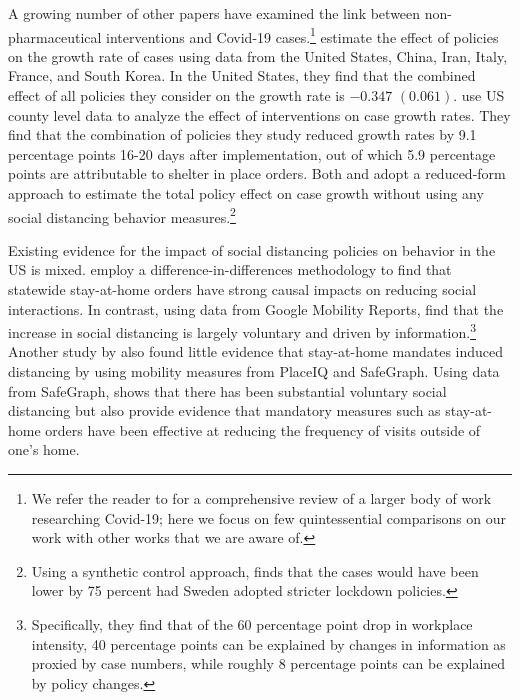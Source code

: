 \documentclass[3p, longtitle]{elsarticle}
\theoremstyle{definition}
\begin{document}
%
%



A growing number of other papers have examined the link between non-pharmaceutical interventions and Covid-19  cases.\footnote{We refer the reader to \cite{avery2020} for a comprehensive review of  a larger body of work researching Covid-19; here we focus on few quintessential comparisons on our work with other works that we are aware of.} \cite{hsiang2020} estimate the effect of policies on the growth rate of cases using
data from the United States, China, Iran, Italy, France, and South
Korea. In the United States, they find that the combined effect of all policies they consider on the
growth rate is $-0.347$ $(0.061)$. \cite{courtemanche2020} use US county level data to analyze the effect
of interventions on case growth rates. They find that the combination
of policies they study reduced growth rates by 9.1 percentage points
16-20 days after implementation, out of which 5.9 percentage points are attributable to shelter in place orders. Both \cite{hsiang2020} and \cite{courtemanche2020} adopt a reduced-form approach to estimate the total policy effect on case growth without using any social distancing behavior measures.\footnote{Using
a synthetic control approach, \cite{cho2020} finds that  the cases would have been lower by 75 percent  had Sweden adopted stricter lockdown policies.}

Existing evidence for the impact of social distancing policies on behavior in the US is mixed.
\cite{abouk2020} employ a difference-in-differences methodology to  find that statewide stay-at-home orders  have  strong causal impacts on reducing social interactions. In contrast, using data from Google Mobility Reports,
\cite{maloney2020}  find that the increase in social distancing is
largely voluntary and driven by information.\footnote{Specifically, they find
that of the 60 percentage point drop in workplace intensity, 40
percentage points can be explained by changes in information as
proxied by case numbers, while roughly 8 percentage points can be
explained by policy changes.} Another study by  \cite{gupta2020} also found little evidence that stay-at-home mandates induced distancing by
using mobility measures from PlaceIQ and SafeGraph. Using data from SafeGraph, \cite{anderson2020} shows that there has been substantial voluntary social distancing but also provide evidence that mandatory measures such as stay-at-home orders have  been effective at reducing the frequency of visits  outside of one's home.
\end{document}
